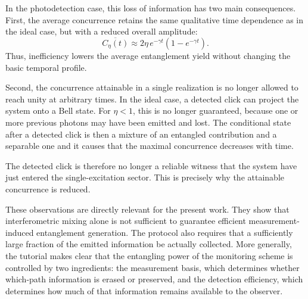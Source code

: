 In the photodetection case, this loss of information has two main consequences. First, the average concurrence retains the same qualitative time dependence as in the ideal case, but with a reduced overall amplitude:
\begin{equation}
	\overline{C_{\eta}(t)}
	\approx
	2\eta\,e^{-\gamma t}\left(1-e^{-\gamma t}\right).
	\label{eq:lewalle_ineff_avg_concurrence}
\end{equation}
Thus, inefficiency lowers the average entanglement yield without changing the basic temporal profile.

Second, the concurrence attainable in a single realization is no longer allowed to reach unity at arbitrary times. In the ideal case, a detected click can project the system onto a Bell state. For \(\eta<1\), this is no longer guaranteed, because one or more previous photons may have been emitted and lost. The conditional state after a detected click is then a mixture of an entangled contribution and a separable one and it causes that the maximal concurrence decreases with time.

The detected click is therefore no longer a reliable witness that the system have just entered the single-excitation sector. This is precisely why the attainable concurrence is reduced.

These observations are directly relevant for the present work. They show that interferometric mixing alone is not sufficient to guarantee efficient measurement-induced entanglement generation. The protocol also requires that a sufficiently large fraction of the emitted information be actually collected. More generally, the tutorial makes clear that the entangling power of the monitoring scheme is controlled by two ingredients: the measurement basis, which determines whether which-path information is erased or preserved, and the detection efficiency, which determines how much of that information remains available to the observer.


